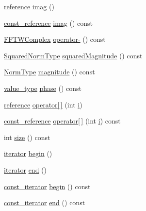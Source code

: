\begin{DoxyCompactItemize}
\item 
\hyperlink{class_f_f_t_w_complex_a7dfe1fb0319193094de12aef4000957d}{reference} \hyperlink{class_f_f_t_w_complex_ae1a5adfc71e42238ebd54cf4c246b750}{imag} ()
\item 
\hyperlink{class_f_f_t_w_complex_abf193fae52159474a60f7377e5c363e5}{const\-\_\-reference} \hyperlink{class_f_f_t_w_complex_a8d2a93864a22f81fc0ee48ecdf9a327d}{imag} () const 
\item 
\hyperlink{class_f_f_t_w_complex}{F\-F\-T\-W\-Complex} \hyperlink{class_f_f_t_w_complex_a368882d425267d78b66541abbe1b802a}{operator-\/} () const 
\item 
\hyperlink{class_f_f_t_w_complex_a048e30a91c9d932442272164d8a8db40}{Squared\-Norm\-Type} \hyperlink{class_f_f_t_w_complex_aca2561a2b291d686d03258e001826839}{squared\-Magnitude} () const 
\item 
\hyperlink{class_f_f_t_w_complex_a32b15a773ea0128be7cecdc7fc49df11}{Norm\-Type} \hyperlink{class_f_f_t_w_complex_a03a17d923f2f8d9b9c4ad82d73e5fc97}{magnitude} () const 
\item 
\hyperlink{class_f_f_t_w_complex_af159fb8086896f4f62494d72ce0f9d38}{value\-\_\-type} \hyperlink{class_f_f_t_w_complex_aeaecda0ca5742102c169d94ba7d11a0a}{phase} () const 
\item 
\hyperlink{class_f_f_t_w_complex_a7dfe1fb0319193094de12aef4000957d}{reference} \hyperlink{class_f_f_t_w_complex_a1fedb437d076f9ac778741e965ec8082}{operator\mbox{[}$\,$\mbox{]}} (int \hyperlink{_read_d_m3___matlab_8m_a6f6ccfcf58b31cb6412107d9d5281426}{i})
\item 
\hyperlink{class_f_f_t_w_complex_abf193fae52159474a60f7377e5c363e5}{const\-\_\-reference} \hyperlink{class_f_f_t_w_complex_a21530ce25d24c38f35f84e1192bf6a2f}{operator\mbox{[}$\,$\mbox{]}} (int \hyperlink{_read_d_m3___matlab_8m_a6f6ccfcf58b31cb6412107d9d5281426}{i}) const 
\item 
int \hyperlink{class_f_f_t_w_complex_a9eaae230d66771125054127143e4aa77}{size} () const 
\item 
\hyperlink{class_f_f_t_w_complex_acd25e1e4222dcf20dd6dcdbd38bdb190}{iterator} \hyperlink{class_f_f_t_w_complex_a57cb222642804fb62a8c75a1e2bae294}{begin} ()
\item 
\hyperlink{class_f_f_t_w_complex_acd25e1e4222dcf20dd6dcdbd38bdb190}{iterator} \hyperlink{class_f_f_t_w_complex_a655cb84ffea3bad72b74a04bcf496762}{end} ()
\item 
\hyperlink{class_f_f_t_w_complex_ade8293628a3a66859ee87cd4cb783308}{const\-\_\-iterator} \hyperlink{class_f_f_t_w_complex_a3f0cff255651d6a8159bcec59900c553}{begin} () const 
\item 
\hyperlink{class_f_f_t_w_complex_ade8293628a3a66859ee87cd4cb783308}{const\-\_\-iterator} \hyperlink{class_f_f_t_w_complex_a2e3efaf4ac47607e508ca203bacfc9d3}{end} () const 
\end{DoxyCompactItemize}


